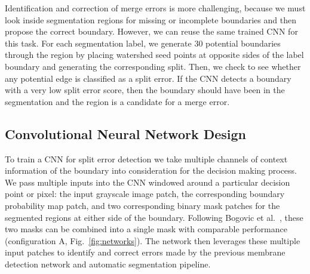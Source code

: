 Identification and correction of merge errors is more challenging, because we must look inside segmentation regions for missing or incomplete boundaries and then propose the correct boundary. However, we can reuse the same trained CNN for this task. For each segmentation label, we generate 30 potential boundaries through the region by placing watershed seed points at opposite sides of the label boundary and generating the corresponding split. Then, we check to see whether any potential edge is classified as a split error. If the CNN detects a boundary with a very low split error score, then the boundary should have been in the segmentation and the region is a candidate for a merge error.







\subsection{Convolutional Neural Network Design}
To train a CNN for split error detection we take multiple channels of context information of the boundary into consideration for the decision making process. We pass multiple inputs into the CNN windowed around a particular decision point or pixel: the input grayscale image patch, the corresponding boundary probability map patch, and two corresponding binary mask patches for the segmented regions at either side of the boundary. Following Bogovic et al.~\cite{BogovicHJ13}, these two masks can be combined into a single mask with comparable performance (configuration A, Fig.~\ref{fig:networks}). The network then leverages these multiple input patches to identify and correct errors made by the previous membrane detection network and automatic segmentation pipeline.

